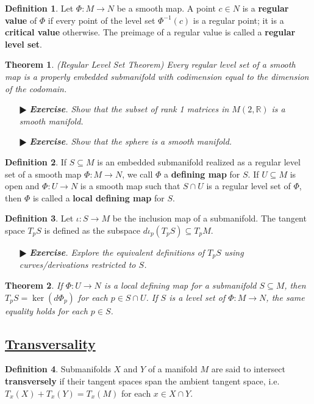 \documentclass[11pt]{amsart}
\newtheorem*{theorem*}{Theorem}
\theoremstyle{definition}
\newtheorem*{definition*}{Definition}
\renewcommand\:{\colon}
\newcommand{\R}{\mathds{R}}
\newcommand{\1}{\mathds{1}}
\newcommand{\exc}[1]{\vspace{-2.5pt}\begin{itemize}[leftmargin=15pt]\item[$\RHD$] \textit{\textbf{Exercise}. #1}\end{itemize}}
\begin{document}
\begin{definition*}
	Let $\Phi\: M \to N$ be a smooth map. A point $c \in N$ is a \textbf{regular value} of $\Phi$ if every point of the level set $\Phi^{-1}(c)$ is a regular point; it is a \textbf{critical value} otherwise. The preimage of a regular value is called a \textbf{regular level set}.
\end{definition*}

\begin{theorem*}
	\textnormal{(Regular Level Set Theorem)} Every regular level set of a smooth map is a properly embedded submanifold with codimension equal to the dimension of the codomain.
\end{theorem*}

\exc{Show that the subset of rank 1 matrices in $M(2, \R)$ is a smooth manifold.}
\exc{Show that the sphere is a smooth manifold.}

\begin{definition*}
	If $S \subseteq M$ is an embedded submanifold realized as a regular level set of a smooth map $\Phi\: M \to N$, we call $\Phi$ a \textbf{defining map} for $S$. If $U \subseteq M$ is open and $\Phi\: U \to N$ is a smooth map such that $S \cap U$ is a regular level set of $\Phi$, then $\Phi$ is called a \textbf{local defining map} for $S$.
\end{definition*}

\begin{definition*}
	Let $\iota\: S \to M$ be the inclusion map of a submanifold. The tangent space $T_pS$ is defined as the subspace $d \iota_p(T_pS) \subseteq T_pM$.
\end{definition*}

\exc{Explore the equivalent definitions of $T_pS$ using curves/derivations restricted to $S$.}

\begin{theorem*}
	If $\Phi\: U \to N$ is a local defining map for a submanifold $S \subseteq M$, then $T_pS = \ker(d\Phi_p)$ for each $p \in S \cap U$. If $S$ is a level set of $\Phi\: M \to N$, the same equality holds for each $p \in S$.
\end{theorem*}

\vskip20pt



\subsection*{\underline{Transversality}}

\begin{definition*}
	Submanifolds $X$ and $Y$ of a manifold $M$ are said to intersect \textbf{transversely} if their tangent spaces span the ambient tangent space, i.e. $T_x(X) + T_x(Y) = T_x(M)$ for each $x \in X \cap Y$.
\end{definition*}
\end{document}

